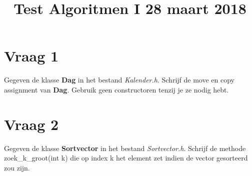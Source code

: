 \documentclass{article}
\begin{document}
\title{Test Algoritmen I 28 maart 2018}
\date{}
\author{}
\maketitle

\section{Vraag 1}
    Gegeven de klasse \textbf{Dag} in het bestand \textit{Kalender.h}. Schrijf de move en copy assignment van \textbf{Dag}. Gebruik geen constructoren tenzij je ze nodig hebt.
\section{Vraag 2}
    Gegeven de klasse \textbf{Sortvector} in het bestand \textit{Sortvector.h}. Schrijf de methode zoek\_k\_groot(int k) die op index k het element zet indien de vector gesorteerd zou zijn.
\end{document}
